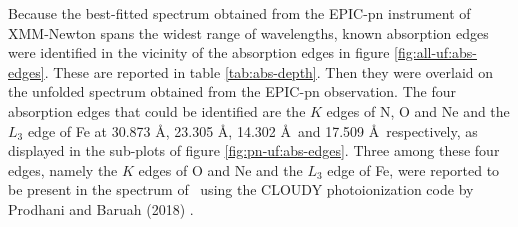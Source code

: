     Because the best-fitted spectrum obtained from the EPIC-pn instrument of XMM-Newton spans the widest range of wavelengths, known absorption edges \cite{bearden1967reevaluation,juett2006high} were identified in the vicinity of the absorption edges in figure \ref{fig:all-uf:abs-edges}. These are reported in table \ref{tab:abs-depth}. Then they were overlaid on the unfolded spectrum obtained from the EPIC-pn observation. The four absorption edges that could be identified are the $K$ edges of N, O and Ne and the $L_3$ edge of Fe at 30.873 \AA, 23.305 \AA, 14.302 \AA\ and 17.509 \AA\ respectively, as displayed in the sub-plots of figure \ref{fig:pn-uf:abs-edges}. Three among these four edges, namely the $K$ edges of O and Ne and the $L_3$ edge of Fe, were reported to be present in the spectrum of \source\ using the CLOUDY photoionization code by Prodhani and Baruah (2018) \cite{prodhani2018galactic}.

